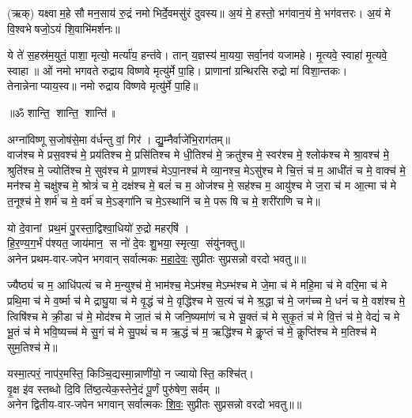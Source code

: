 (ऋक्)   यक्ष्वाम॒हे सौमन॒साय॑ रु॒द्रं नमोभिर्दे॒वमसु॑रं दुवस्य॥ अ॒यं मे॒ हस्तो॒ भग॑वान॒यं मे॒ भग॑वत्तरः। अ॒यं मे वि॒श्वभेषजो॒ऽयं शि॒वाभि॑मर्शनः॥

ये ते॑ स॒हस्र॑म॒युतं॒ पाशा॒ मृत्यो॒ मर्त्या॑य॒ हन्त॑वे। तान् य॒ज्ञस्य॑ मा॒यया॒ सर्वा॒नव॑ यजामहे। मृ॒त्यवे॒ स्वाहा॑ मृ॒त्यवे॒ स्वाहा॥ ओं नमो भगवते रुद्राय विष्णवे मृत्यु॑र्मे पा॒हि। प्राणानां ग्रन्थिरसि रुद्रो मा॑ विशा॒न्तकः। तेनान्नेनाप्याय॒स्व॥ नमो रुद्राय विष्णवे मृत्यु॑र्मे पा॒हि॥\rbrack
 
\centerline{॥ॐ शान्ति॒ शान्ति॒ शान्ति॑॥}

{\small \closesection}

\newcommand{\cham}[3]{\refstepcounter{cj}%
#1\\
अनेन #2-वार-जपेन भगवान् सर्वात्मकः \underline{#3} सुप्रीतः सुप्रसन्नो वरदो भवतु॥\devanumber{\arabic{cj}}॥}

अग्ना॑विष्णू स॒जोष॑से॒मा व॑र्धन्तु वां॒ गिर॑। द्यु॒म्नैर्वाजे॑भि॒राग॑तम्॥ \\
वाज॑श्च मे प्रस॒वश्च॑ मे॒ प्रय॑तिश्च मे॒ प्रसि॑तिश्च मे धी॒तिश्च॑ मे॒ क्रतु॑श्च मे॒ स्वर॑श्च मे॒ श्लोक॑श्च मे श्रा॒वश्च॑ मे॒ श्रुति॑श्च मे॒ ज्योति॑श्च मे॒ सुव॑श्च मे प्रा॒णश्च॑ मेऽपा॒नश्च॑ मे व्या॒नश्च॒ मेऽसु॑श्च मे चि॒त्तं च॑ म॒ आधी॑तं च मे॒ वाक्च॑ मे॒ मन॑श्च मे॒ चक्षु॑श्च मे॒ श्रोत्रं॑ च मे॒ दक्ष॑श्च मे॒ बलं॑ च म॒ ओज॑श्च मे॒ सह॑श्च म॒ आयु॑श्च मे ज॒रा च॑ म आ॒त्मा च॑ मे त॒नूश्च॑ मे॒ शर्म॑ च मे॒ वर्म॑ च मे॒ऽङ्गा॑नि च मे॒ऽस्थानि॑ च मे॒ परूषि च मे॒ शरी॑राणि च मे॥

\cham{यो दे॒वानां प्रथ॒मं पु॒रस्ता॒द्विश्वा॒धियो॑ रु॒द्रो महर्‌षि॑।\\
हि॒र॒ण्य॒ग॒र्भं प॑श्यत॒ जाय॑मान॒ स नो॑ दे॒वः शु॒भया॒ स्मृत्या॒ संयु॑नक्तु॥}{प्रथम}{महादेवः}

ज्यैष्ठ्यं॑ च म॒ आधि॑पत्यं च मे म॒न्युश्च॑ मे॒ भाम॑श्च॒ मेऽम॑श्च॒ मेऽम्भ॑श्च मे जे॒मा च॑ मे महि॒मा च॑ मे वरि॒मा च॑ मे प्रथि॒मा च॑ मे व॒र्ष्मा च॑ मे द्राघु॒या च॑ मे वृ॒द्धं च॑ मे॒ वृद्धि॑श्च मे स॒त्यं च॑ मे श्र॒द्धा च॑ मे॒ जग॑च्च मे॒ धनं॑ च मे॒ वश॑श्च मे॒ त्विषि॑श्च मे क्री॒डा च॑ मे॒ मोद॑श्च मे जा॒तं च॑ मे जनि॒ष्यमा॑णं च मे सू॒क्तं च॑ मे सुकृ॒तं च॑ मे वि॒त्तं च॑ मे॒ वेद्यं॑ च मे भू॒तं च॑ मे भवि॒ष्यच्च॑ मे सु॒गं च॑ मे सु॒पथं॑ च म ऋ॒द्धं च॑ म॒ ऋद्धि॑श्च मे कॢ॒प्तं च॑ मे॒ कॢप्ति॑श्च मे म॒तिश्च॑ मे सुम॒तिश्च॑ मे॥

\cham{यस्मा॒त्परं॒ नाप॑र॒मस्ति॒ किञ्चि॒द्यस्मा॒न्नाणी॑यो॒ न ज्यायोस्ति॒ कश्चि॑त्।\\
वृ॒क्ष इ॑व स्तब्धो दि॒वि ति॑ष्ठ॒त्येक॒स्तेने॒दं पू॒र्णं पुरु॑षेण॒ सर्वम्॥}{द्वितीय}{शिवः}


